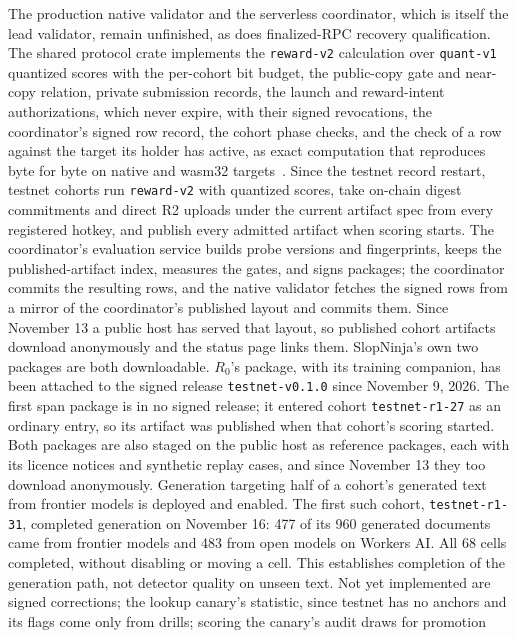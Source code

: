 The production native validator and the serverless coordinator, which is itself
the lead validator, remain unfinished, as does finalized-RPC recovery
qualification. The shared protocol crate implements the \texttt{reward-v2}
calculation over \texttt{quant-v1} quantized scores with the per-cohort bit
budget, the public-copy gate and near-copy relation, private submission
records, the launch and reward-intent authorizations, which never expire, with
their signed revocations, the coordinator's signed row record, the cohort phase
checks, and the check of a row against the target its holder has active, as
exact computation that reproduces byte for byte on native and wasm32
targets~\cite{protocolcrate}. Since the testnet record restart, testnet cohorts
run \texttt{reward-v2} with quantized scores, take on-chain digest commitments
and direct R2 uploads under the current artifact spec from every registered
hotkey, and publish every admitted artifact when scoring starts. The
coordinator's evaluation service builds probe versions and fingerprints, keeps
the published-artifact index, measures the gates, and signs packages; the
coordinator commits the resulting rows, and the native validator fetches the
signed rows from a mirror of the coordinator's published layout and commits
them. Since November 13 a public host has served that layout, so published
cohort artifacts download anonymously and the status page links them.
SlopNinja's own two packages are both downloadable. \(R_0\)'s package, with
its training companion, has been attached to the signed release
\texttt{testnet-v0.1.0} since November 9, 2026. The first span package is in
no signed release; it entered cohort \texttt{testnet-r1-27} as an ordinary
entry, so its artifact was published when that cohort's scoring started. Both
packages are also staged on the public host as reference packages, each with
its licence notices and synthetic replay cases, and since November 13 they too
download anonymously.
Generation targeting half of a cohort's generated text from frontier models
is deployed and enabled. The first such cohort, \texttt{testnet-r1-31},
completed generation on November 16: 477 of its 960 generated documents came
from frontier models and 483 from open models on Workers AI. All 68 cells
completed, without disabling or moving a cell. This establishes completion
of the generation path, not detector quality on unseen text.
Not yet implemented are signed corrections; the lookup
canary's statistic, since testnet has no anchors and its
flags come only from drills; scoring the canary's audit draws for promotion
